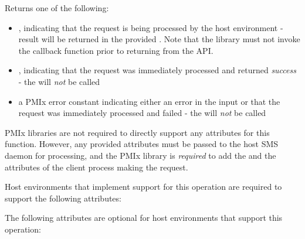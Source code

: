 Returns one of the following:

\begin{itemize}
    \item {}, indicating that the request is being processed by the host environment - result will be returned in the provided . Note that the library must not invoke the callback function prior to returning from the \ac{API}.
    \item {}, indicating that the request was immediately processed and returned \textit{success} - the  will \textit{not} be called
    \item a PMIx error constant indicating either an error in the input or that the request was immediately processed and failed - the  will \textit{not} be called
\end{itemize}

\reqattrstart
\ac{PMIx} libraries are not required to directly support any attributes for this function. However, any provided attributes must be passed to the host \ac{SMS} daemon for processing, and the \ac{PMIx} library is \textit{required} to add the  and the  attributes of the client process making the request.

\divider

Host environments that implement support for this operation are required to support the following attributes:


\reqattrend

\optattrstart
The following attributes are optional for host environments that support this operation:


